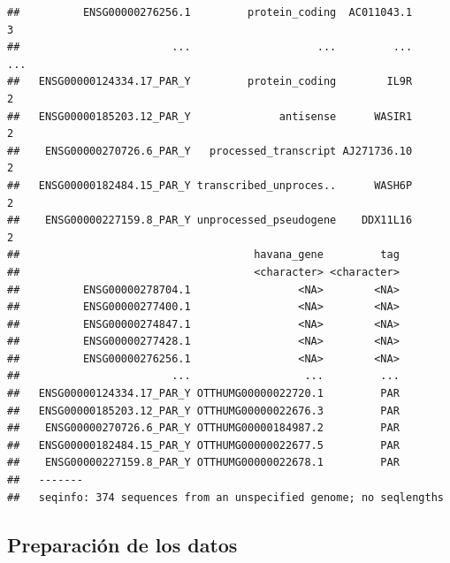 \documentclass[
]{article}
\newenvironment{Shaded}{\begin{snugshade}}{\end{snugshade}}
\newcommand{\CommentTok}[1]{\textcolor[rgb]{0.56,0.35,0.01}{\textit{#1}}}
\newcommand{\FunctionTok}[1]{\textcolor[rgb]{0.13,0.29,0.53}{\textbf{#1}}}
\newcommand{\NormalTok}[1]{#1}
\newcommand{\OtherTok}[1]{\textcolor[rgb]{0.56,0.35,0.01}{#1}}
\newcommand{\SpecialCharTok}[1]{\textcolor[rgb]{0.81,0.36,0.00}{\textbf{#1}}}
\newcommand{\StringTok}[1]{\textcolor[rgb]{0.31,0.60,0.02}{#1}}
\begin{document}
\begin{verbatim}
##          ENSG00000276256.1         protein_coding  AC011043.1           3
##                        ...                    ...         ...         ...
##   ENSG00000124334.17_PAR_Y         protein_coding        IL9R           2
##   ENSG00000185203.12_PAR_Y              antisense      WASIR1           2
##    ENSG00000270726.6_PAR_Y   processed_transcript AJ271736.10           2
##   ENSG00000182484.15_PAR_Y transcribed_unproces..      WASH6P           2
##    ENSG00000227159.8_PAR_Y unprocessed_pseudogene    DDX11L16           2
##                                     havana_gene         tag
##                                     <character> <character>
##          ENSG00000278704.1                 <NA>        <NA>
##          ENSG00000277400.1                 <NA>        <NA>
##          ENSG00000274847.1                 <NA>        <NA>
##          ENSG00000277428.1                 <NA>        <NA>
##          ENSG00000276256.1                 <NA>        <NA>
##                        ...                  ...         ...
##   ENSG00000124334.17_PAR_Y OTTHUMG00000022720.1         PAR
##   ENSG00000185203.12_PAR_Y OTTHUMG00000022676.3         PAR
##    ENSG00000270726.6_PAR_Y OTTHUMG00000184987.2         PAR
##   ENSG00000182484.15_PAR_Y OTTHUMG00000022677.5         PAR
##    ENSG00000227159.8_PAR_Y OTTHUMG00000022678.1         PAR
##   -------
##   seqinfo: 374 sequences from an unspecified genome; no seqlengths
\end{verbatim}

\subsection{Preparación de los datos}\label{preparaciuxf3n-de-los-datos}

\begin{Shaded}
\end{Shaded}
\end{document}
